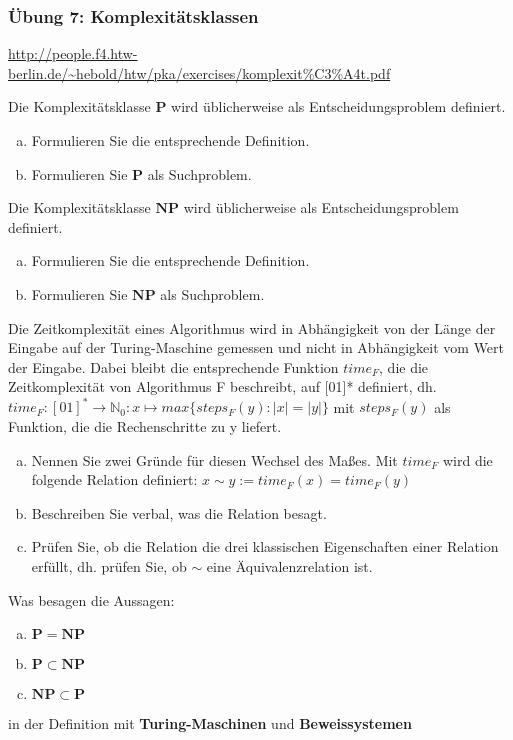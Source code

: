 \begin{card}
	\frametitle{Übung 7: Komplexitätsklassen}
	\url{http://people.f4.htw-berlin.de/~hebold/htw/pka/exercises/komplexit\%C3\%A4t.pdf}
\end{card}

\begin{card}
	Die Komplexitätsklasse $\mathbf{P}$ wird üblicherweise als Entscheidungsproblem definiert.
	\begin{enumerate}[a)]
	\item Formulieren Sie die entsprechende Definition.
	\item Formulieren Sie $\mathbf{P}$ als Suchproblem. 
	\end{enumerate}
	\hr
\end{card}

\begin{card}
	Die Komplexitätsklasse $\mathbf{NP}$ wird üblicherweise als Entscheidungsproblem definiert.
	\begin{enumerate}[a)]
	\item Formulieren Sie die entsprechende Definition.
	\item Formulieren Sie $\mathbf{NP}$ als Suchproblem. 
	\end{enumerate}
	\hr
\end{card}

\begin{card}
	Die Zeitkomplexität eines Algorithmus wird in Abhängigkeit von der Länge der Eingabe auf der Turing-Maschine gemessen und nicht in Abhängigkeit vom Wert der Eingabe. Dabei bleibt die entsprechende Funktion $time_F$, die die Zeitkomplexität von Algorithmus F beschreibt, auf [01]* definiert, dh.
	$time_F:[01]^* \rightarrow \mathbb{N}_0 : x \mapsto max \{ steps_F(y):|x| = |y| \}$
	mit $steps_F(y)$ als Funktion, die die Rechenschritte zu y liefert. 
	\begin{enumerate}[a)]
	\item Nennen Sie zwei Gründe für diesen Wechsel des Maßes. Mit
	$time_F$ wird die folgende Relation definiert: 
	$x \sim y := time_F(x) = time_F(y)$
	\item Beschreiben Sie verbal, was die Relation besagt.
	\item Prüfen Sie, ob die Relation die drei klassischen Eigenschaften einer Relation erfüllt, dh. prüfen Sie, ob $\sim$ eine Äquivalenzrelation ist. 
	\end{enumerate}
	\hr
\end{card}

\begin{card}
	Was besagen die Aussagen: 
	\begin{enumerate}[a)]
	\item $\mathbf{P = NP}$
	\item $\mathbf{P \subset NP}$
	\item $\mathbf{NP \subset P}$
	\end{enumerate}
	in der Definition mit \textbf{Turing-Maschinen} und \textbf{Beweissystemen}
	\hr
\end{card}

